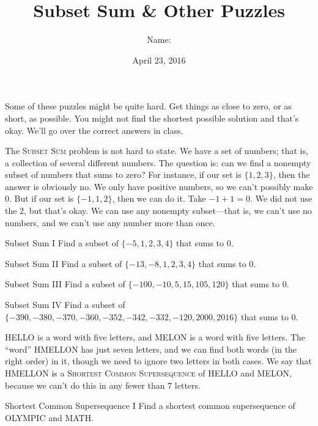 \documentclass[12pt,letterpaper]{article}
\title{Subset Sum \& Other Puzzles}
\author{Name: \underline{\hspace{5cm}}}
\date{April 23, 2016}
\begin{document}
\maketitle

\thispagestyle{empty}

Some of these puzzles might be quite hard. Get things as close to zero, or as
short, as possible. You might not find the shortest possible solution and that's
okay. We'll go over the correct answers in class.

The \textsc{Subset Sum} problem is not hard to state. We have a set of numbers;
that is, a collection of several different numbers. The question is: can we find
a nonempty subset of numbers that sums to zero? For instance, if our set is
$\{1, 2, 3\}$, then the answer is obviously no. We only have positive numbers,
so we can't possibly make $0$. But if our set is $\{-1, 1, 2\}$, then we can do
it. Take $-1 + 1 = 0$. We did not use the $2$, but that's okay. We can use any
nonempty subset---that is, we can't use no numbers, and we can't use any number
more than once.

\begin{problem}{Subset Sum I}
 Find a subset of $\{-5, 1, 2, 3, 4\}$ that sums to $0$.
\end{problem}

\begin{problem}{Subset Sum II}
 Find a subset of $\{-13, -8, 1, 2, 3, 4\}$ that sums to $0$.
\end{problem}

\begin{problem}{Subset Sum III}
 Find a subset of $\{-100, -10, 5, 15, 105, 120\}$ that sums to $0$.
\end{problem}

\begin{problem}{Subset Sum IV}
 Find a subset of $\{-390, -380, -370, -360, -352, -342, -332, -120, 2000,
 2016\}$ that sums to $0$.
\end{problem}

\vspace{2em}

HELLO is a word with five letters, and MELON is a word with five letters. The
``word'' HMELLON has just seven letters, and we can find both words (in the
right order) in it, though we need to ignore two letters in both cases. We say
that HMELLON is a \textsc{Shortest Common Supersequence} of HELLO and MELON,
because we can't do this in any fewer than $7$ letters.

\begin{problem}{Shortest Common Supersequence I}
 Find a shortest common supersequence of OLYMPIC and MATH.
\end{problem}
\end{document}
